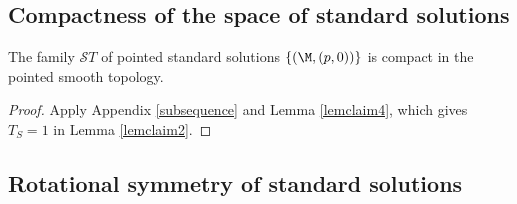\subsection{Compactness of the space of standard solutions}
\label{standardlycompact}

\begin{lemma}
  \label{lem:kl-compactness-space-standard-solutions-compactness-standard-solutions}
 \label{standardcompactness}
The family ${\mathcal ST}$ of pointed standard solutions $\{(\M,(p,0))\}$ is
compact in the pointed smooth topology.
\end{lemma}
\begin{proof}
\sketch Apply Appendix \ref{subsequence} and Lemma \ref{lemclaim4}, which gives
$T_S=1$ in Lemma \ref{lemclaim2}.
\end{proof}

\subsection{Rotational symmetry of standard solutions}
 \label{claimII.2.1}

